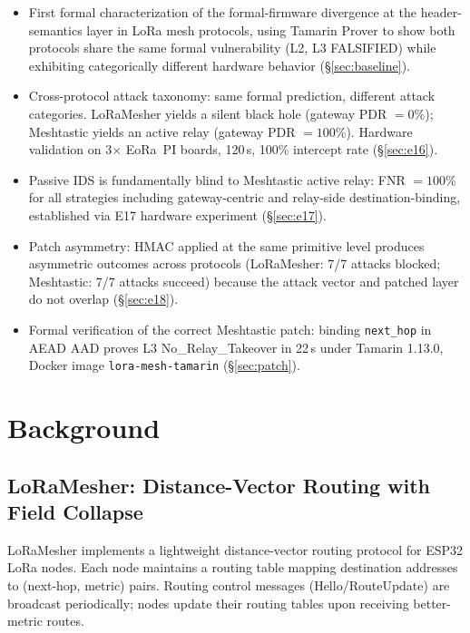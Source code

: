 \documentclass[journal]{IEEEtran}
\begin{document}
\begin{itemize}
  \item[\textbf{C1}] First formal characterization of the formal-firmware
    divergence at the header-semantics layer in LoRa mesh protocols, using
    Tamarin Prover to show both protocols share the same formal vulnerability
    (L2, L3 FALSIFIED) while exhibiting categorically different hardware
    behavior (\S\ref{sec:baseline}).

  \item[\textbf{C2}] Cross-protocol attack taxonomy: same formal prediction,
    different attack categories. LoRaMesher yields a silent black hole
    (gateway PDR $= 0$\%); Meshtastic yields an active relay
    (gateway PDR $= 100$\%). Hardware validation on 3$\times$ EoRa~PI boards,
    120\,s, 100\% intercept rate (\S\ref{sec:e16}).

  \item[\textbf{C3}] Passive IDS is fundamentally blind to Meshtastic active
    relay: FNR $= 100$\% for all strategies including gateway-centric and
    relay-side destination-binding, established via E17 hardware experiment
    (\S\ref{sec:e17}).

  \item[\textbf{C4}] Patch asymmetry: HMAC applied at the same primitive level
    produces asymmetric outcomes across protocols (LoRaMesher: 7/7 attacks
    blocked; Meshtastic: 7/7 attacks succeed) because the attack vector
    and patched layer do not overlap (\S\ref{sec:e18}).

  \item[\textbf{C5}] Formal verification of the correct Meshtastic patch:
    binding \texttt{next\_hop} in AEAD AAD proves L3 No\_Relay\_Takeover in
    22\,s under Tamarin 1.13.0, Docker image \texttt{lora-mesh-tamarin}
    (\S\ref{sec:patch}).
\end{itemize}

\section{Background}
\label{sec:background}

\subsection{LoRaMesher: Distance-Vector Routing with Field Collapse}

LoRaMesher implements a lightweight distance-vector routing protocol for
ESP32 LoRa nodes. Each node maintains a routing table mapping destination
addresses to (next-hop, metric) pairs. Routing control messages
(Hello/RouteUpdate) are broadcast periodically; nodes update their routing
tables upon receiving better-metric routes.
\end{document}
